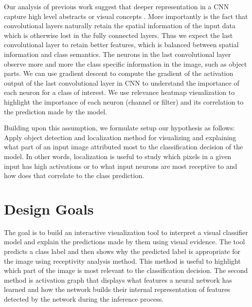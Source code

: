 Our analysis of previous work suggest that deeper representation in a CNN capture high level abstracts or visual concepts \cite{Zeiler}. More importantly is the fact that convolutional layers naturally retain the spatial information of the input data which is otherwise lost in the fully connected layers. Thus we expect the last convolutional layer to retain better features, which is balanced between spatial information and class semantics. The neurons in the last convolutional layer observe more and more the class specific information in the image, such as object parts. We can use gradient descent to compute the gradient of the activation output of the last convolutional layer in CNN to understand the importance of each neuron for a class of interest. We use relevance heatmap visualization to highlight the importance of each neuron (channel or filter) and its correlation to the prediction made by the model.

Building upon this assumption, we formulate setup our hypothesis as follows: Apply object detection and localization method for visualizing and explaining what part of an input image attributed most to the classification decision of the model. In other words, localization is useful to study which pixels in a given input has high activations or to what input neurons are most receptive to and how does that correlate to the class prediction.


\section{Design Goals}

The goal is to build an interactive visualization tool to interpret a visual classifier model and explain the predictions made by them using visual evidence.  The tool predicts a class label and then shows why the predicted label is appropriate for the image using receptivity analysis method. This method is useful to highlight which part of the image is most relevant to the classification decision. The second method is activation graph that displays what features a neural network has learned and how the network builds their internal representation of  features detected by the network during the inference process. 

